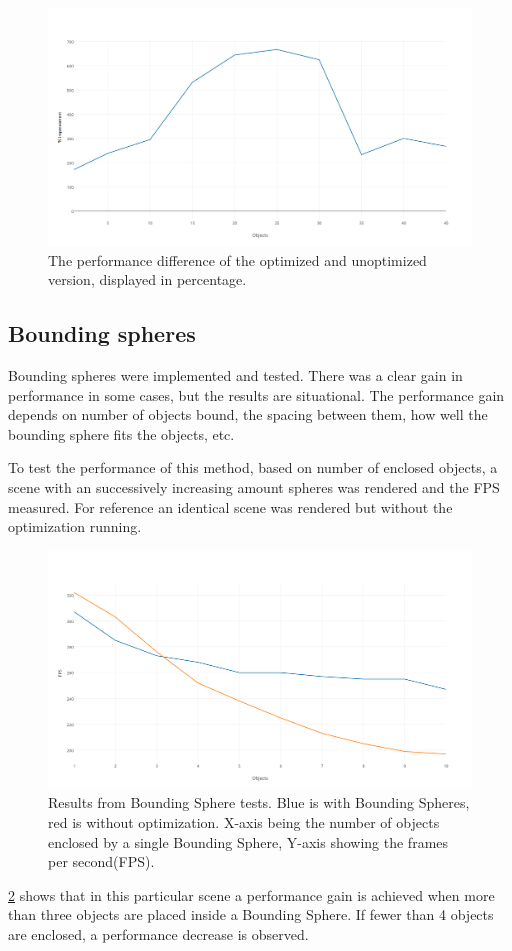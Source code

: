 			\begin{figure}[H]
				\centering
				\includegraphics[width=1.0\linewidth]{figure/TestResults/PercentageImprovement.png} 
				\caption{The performance difference of the optimized and unoptimized version, 
				displayed in percentage.}
				\label{orthcull}
			\end{figure}

		


		\subsection{Bounding spheres}

			Bounding spheres were implemented and tested. There was a clear
			gain in performance in some cases, but the results are situational. 
			The performance gain depends on number of objects bound, the spacing
			between them, how well the bounding sphere fits the objects, etc.   

			To test the performance of this method, based on number of enclosed 
			objects, a scene with an successively increasing amount spheres was 
			rendered and the FPS measured. For reference an identical scene was 
			rendered but without the optimization running.

			\begin{figure}[H]
				\centering
				\includegraphics[width=1.0\linewidth]{figure/TestResults/BSObjects.png} 
				\caption{Results from Bounding Sphere tests. Blue is with Bounding Spheres, 
				red is without optimization. X-axis being the number of objects enclosed by 
				a single Bounding Sphere, Y-axis showing the frames per second(FPS).}
				\label{boundsphere}
			\end{figure}

			\ref{boundsphere} shows that in this particular scene a performance gain is 
			achieved when more than three objects are placed inside a Bounding Sphere. If
			fewer than 4 objects are enclosed, a performance decrease is 
			observed. 
